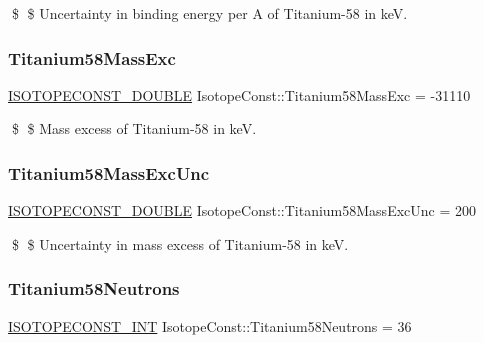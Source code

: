 \$ \$ Uncertainty in binding energy per A of Titanium-\/58 in keV. \mbox{\label{group___isotope_const-_titanium-_ti58_ga641457051ea871fa9bf9ee9d4a20bdd1}} 
\subsubsection{\texorpdfstring{Titanium58\+Mass\+Exc}{Titanium58MassExc}}
{\footnotesize\ttfamily \mbox{\hyperlink{group___isotope_const-_macros_ga8f45a7272ce02c0b4c65c44636ed719a}{I\+S\+O\+T\+O\+P\+E\+C\+O\+N\+S\+T\+\_\+\+D\+O\+U\+B\+LE}} Isotope\+Const\+::\+Titanium58\+Mass\+Exc = -\/31110}

\$ \$ Mass excess of Titanium-\/58 in keV. \mbox{\label{group___isotope_const-_titanium-_ti58_ga0b93fd9bcdea6ffbc649fc0d2a867c2d}} 
\subsubsection{\texorpdfstring{Titanium58\+Mass\+Exc\+Unc}{Titanium58MassExcUnc}}
{\footnotesize\ttfamily \mbox{\hyperlink{group___isotope_const-_macros_ga8f45a7272ce02c0b4c65c44636ed719a}{I\+S\+O\+T\+O\+P\+E\+C\+O\+N\+S\+T\+\_\+\+D\+O\+U\+B\+LE}} Isotope\+Const\+::\+Titanium58\+Mass\+Exc\+Unc = 200}

\$ \$ Uncertainty in mass excess of Titanium-\/58 in keV. \mbox{\label{group___isotope_const-_titanium-_ti58_ga44ad2e952beec8f48895612c893141d4}} 
\subsubsection{\texorpdfstring{Titanium58\+Neutrons}{Titanium58Neutrons}}
{\footnotesize\ttfamily \mbox{\hyperlink{group___isotope_const-_macros_ga5f18360b3e99483a35c32d789e62621c}{I\+S\+O\+T\+O\+P\+E\+C\+O\+N\+S\+T\+\_\+\+I\+NT}} Isotope\+Const\+::\+Titanium58\+Neutrons = 36}

